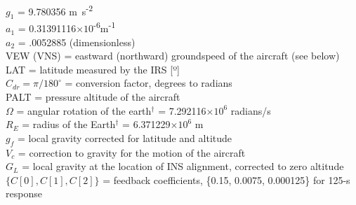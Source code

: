 \documentclass[
  english,
]{book}
\begin{document}
\(g_{1}\) = 9.780356 m~s\textsuperscript{-2}\\
\(a_{1}\) = 0.31391116\(\times 10\)\textsuperscript{-6}m\textsuperscript{-1}\\
\(a_{2}\) = .0052885 (dimensionless)\\
VEW (VNS) = eastward (northward) groundspeed of the aircraft (see
below)\\
LAT = latitude measured by the IRS {[}º{]}\\
\(C_{dr}=\pi/180^{\circ}\) = conversion factor, degrees to radians\\
PALT = pressure altitude of the aircraft\\
\(\Omega\) = angular rotation of the earth\(^{\dagger}\) = 7.292116\(\times10^{6}\)
radians/s\\
\(R_{E}\) = radius of the Earth\(^{\dagger}\) = 6.371229\(\times10^{6}\)
m\\
\(g_{f}\) = local gravity corrected for latitude and altitude\\
\(V_{c}\) = correction to gravity for the motion of the aircraft\\
\(G_{L}\) = local gravity at the location of INS alignment, corrected
to zero altitude\\
\(\{C[0],C[1],C[2]\}\) = feedback coefficients, \{0.15, 0.0075, 0.000125\}
for 125-s response
\end{document}
